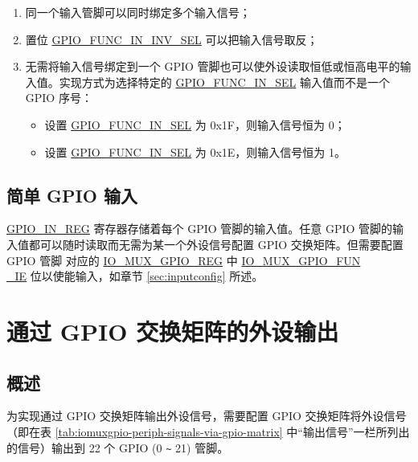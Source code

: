 \documentclass[main\_\_CN.tex]{subfiles}
\begin{document}
\begin{tiplisting}
\vspace{-2em}
\begin{enumerate}
\item \label{input-note-1} 同一个输入管脚可以同时绑定多个输入信号；
\item \label{input-note-2} 置位 \hyperref[fielddesc:GPIOFUNCNININVSEL]{GPIO\_FUNC\_IN\_INV\_SEL} 可以把输入信号取反；
\item \label{input-note-3}无需将输入信号绑定到一个 GPIO 管脚也可以使外设读取恒低或恒高电平的输入值。实现方式为选择特定的 \hyperref[fielddesc:GPIOFUNCNINSEL]{GPIO\_FUNC\_IN\_SEL} 输入值而不是一个 GPIO 序号：
\begin {itemize}
\item 设置 \hyperref[fielddesc:GPIOFUNCNINSEL]{GPIO\_FUNC\_IN\_SEL} 为 0x1F，则输入信号恒为 0；
\item 设置 \hyperref[fielddesc:GPIOFUNCNINSEL]{GPIO\_FUNC\_IN\_SEL} 为 0x1E，则输入信号恒为 1。
\end{itemize}
\end{enumerate}
\end{tiplisting}

\subsection{简单 GPIO 输入}\label{IOMUXSimpleGPIOInput}

\hyperref[regdesc:GPIOINREG]{GPIO\_IN\_REG} 寄存器存储着每个 GPIO 管脚的输入值。任意 GPIO 管脚的输入值都可以随时读取而无需为某一个外设信号配置 GPIO 交换矩阵。但需要配置 GPIO 管脚  对应的 \hyperref[regdesc:IOMUXGPIONREG]{IO\_MUX\_GPIO\_REG} 中 \hyperref[fielddesc:IOMUXGPIONFUNIE]{IO\_MUX\_GPIO\_FUN\\\_IE} 位以使能输入，如章节 \ref{sec:inputconfig} 所述。

\section{通过 GPIO 交换矩阵的外设输出}\label{sec:peripheral-output-via-gpio-matrix}

\subsection{概述}

为实现通过 GPIO 交换矩阵输出外设信号，需要配置 GPIO 交换矩阵将外设信号（即在表 \ref{tab:iomuxgpio-periph-signals-via-gpio-matrix} 中“输出信号”一栏所列出的信号）输出到 22 个 GPIO (0 \verb+~+ 21) 管脚。
\end{document}
